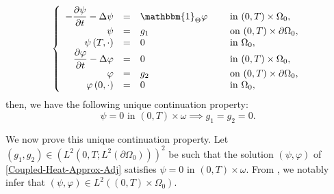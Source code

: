 \documentclass[JEP,XML,SOM,Unicode,NoFloatCountersInSection]{cedram}
\theoremstyle{definition}
\begin{document}
\begin{equation}
\label{Coupled-Heat-Approx-Adj}
\left\{
\begin{array}{rcll}
-\dfrac{\partial \psi}{\partial t}-\Delta \psi &=&\mathbbm{1}_{\Theta}\varphi \quad&\text{ in }(0,T) \times \Omega_0,
\\
\psi &=& g_1 &\text{ on }(0,T) \times \partial \Omega_0,
\\
\psi \left(T,\cdot\right) &=& 0 &\text{ in }\Omega_0,
\\
\dfrac{\partial \varphi}{\partial t}-\Delta \varphi &=& 0 &\text{ in }(0,T) \times \Omega_0,
\\
\varphi &=& g_2 &\text{ on }(0,T) \times \partial \Omega_0,
\\
\varphi\left(0,\cdot\right) &=& 0 &\text{ in }\Omega_0,
\end{array}
\right.
\end{equation}
then, we have the following unique continuation property:
\begin{equation}
\label{UC-Adj-Coupled}
\psi = 0 \text{ in } (0,T) \times \omega \implies g_1 = g_2 = 0.
\end{equation}

We now prove this unique continuation property. Let $(g_1, g_2) \in (L^2(0,T; L^2(\partial\Omega_0)))^2$ be such that the solution $(\psi, \varphi)$ of \eqref{Coupled-Heat-Approx-Adj} satisfies $\psi = 0$ in $(0,T) \times \omega$. From \cite[(15.17--18), p.\,86]{LionsMagenes2}, we notably infer that $(\psi,\varphi)\in L^2((0,T)\times\Omega_0)$.
\end{document}
